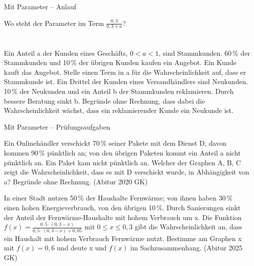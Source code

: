 \begin{aufgabe}{Mit Parameter – Anlauf}
\begin{teile}
\teil Wo steht der Parameter im Term $\frac{0{,}3}{0{,}3 + a}$? \\  \\  \\ 
\teil Ein Anteil a der Kunden eines Geschäfts, $0 < a < 1$, sind Stammkunden. 60\,\% der Stammkunden und 10\,\% der übrigen Kunden kaufen ein Angebot. Ein Kunde kauft das Angebot. Stelle einen Term in a für die Wahrscheinlichkeit auf, dass er Stammkunde ist. \leerfeld
\teil Ein Drittel der Kunden eines Versandhändlers sind Neukunden. 10\,\% der Neukunden und ein Anteil b der Stammkunden reklamieren. Durch bessere Beratung sinkt b. Begründe ohne Rechnung, dass dabei die Wahrscheinlichkeit wächst, dass ein reklamierender Kunde ein Neukunde ist.
\end{teile}
\end{aufgabe}

\begin{aufgabe}{Mit Parameter – Prüfungsaufgaben}
\begin{teile}
\teil Ein Onlinehändler verschickt 70\,\% seiner Pakete mit dem Dienst D, davon kommen 90\,\% pünktlich an; von den übrigen Paketen kommt ein Anteil a nicht pünktlich an. Ein Paket kam nicht pünktlich an. Welcher der Graphen A, B, C zeigt die Wahrscheinlichkeit, dass es mit D verschickt wurde, in Abhängigkeit von a? Begründe ohne Rechnung. \hfill (Abitur 2020 GK)

\begin{ksys}[xmin=0,xmax=1,ymin=0,ymax=1,xstep=0.2,ystep=0.2,ablesen]    \end{ksys}
\teil In einer Stadt nutzen 50\,\% der Haushalte Fernwärme; von ihnen haben 30\,\% einen hohen Energieverbrauch, von den übrigen 10\,\%. Durch Sanierungen sinkt der Anteil der Fernwärme-Haushalte mit hohem Verbrauch um x. Die Funktion $f(x) = \frac{0{,}5 \cdot (0{,}3 - x)}{0{,}5 \cdot (0{,}3 - x) + 0{,}05}$ mit $0 \le x \le 0{,}3$ gibt die Wahrscheinlichkeit an, dass ein Haushalt mit hohem Verbrauch Fernwärme nutzt. Bestimme am Graphen x mit $f(x) = 0{,}6$ und deute x und $f(x)$ im Sachzusammenhang. \hfill (Abitur 2025 GK)

\begin{ksys}[xmin=0,xmax=0.3,ymin=0,ymax=1,xstep=0.05,ystep=0.1,ablesen]  \end{ksys}
\end{teile}
\end{aufgabe}
